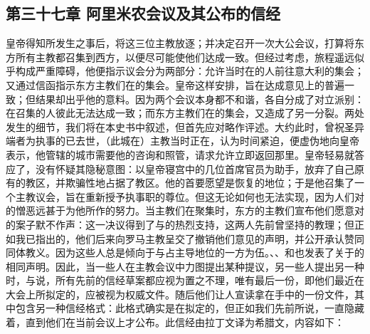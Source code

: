 
\subsection{第三十七章 阿里米农会议及其公布的信经}

皇帝得知所发生之事后，将这三位主教放逐；并决定召开一次大公会议，打算将东方所有主教都召集到西方，以便尽可能使他们达成一致。但经过考虑，旅程遥远似乎构成严重障碍，他便指示议会分为两部分：允许当时在的人前往意大利的集会；又通过信函指示东方主教们在的集会。皇帝这样安排，旨在达成意见上的普遍一致；但结果却出乎他的意料。因为两个会议本身都不和谐，各自分成了对立派别：在召集的人彼此无法达成一致；而东方主教们在的集会，又造成了另一分裂。两处发生的细节，我们将在本史书中叙述，但首先应对略作评述。大约此时，曾祝圣异端者为执事的已去世，（此城在）主教当时正在，认为时间紧迫，便虚伪地向皇帝表示，他管辖的城市需要他的咨询和照管，请求允许立即返回那里。皇帝轻易就答应了，没有怀疑其隐秘意图：以皇帝寝宫中的几位首席官员为助手，放弃了自己原有的教区，并欺骗性地占据了教区。他的首要愿望是恢复的地位；于是他召集了一个主教议会，旨在重新授予执事职的尊位。但这无论如何也无法实现，因为人们对的憎恶远甚于为他所作的努力。当主教们在聚集时，东方的主教们宣布他们愿意对的案子默不作声：这一决议得到了与的热烈支持，这两人先前曾坚持的教理；但正如我已指出的，他们后来向罗马主教呈交了撤销他们意见的声明，并公开承认赞同同体教义。因为这些人总是倾向于与占主导地位的一方为伍。、、和也发表了关于的相同声明。因此，当一些人在主教会议中力图提出某种提议，另一些人提出另一种时，与说，所有先前的信经草案都应视为置之不理，唯有最后一份，即他们最近在大会上所拟定的，应被视为权威文件。随后他们让人宣读拿在手中的一份文件，其中包含另一种信经格式：此格式确实是在拟定的，但正如我们先前所说，一直隐藏着，直到他们在当前会议上才公布。此信经由拉丁文译为希腊文，内容如下：\par

\par

